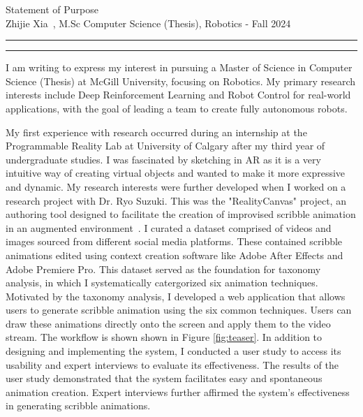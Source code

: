 \documentclass{article}
\newcommand{\soptitle}{Statement of Purpose}
\newcommand{\yourname}{Zhijie Xia}
\begin{document}
\begin{center}\LARGE\soptitle\\
\large \yourname\ , M.Sc Computer Science (Thesis), Robotics - Fall 2024
\end{center}

\hrule
\vspace{1pt}
\hrule height 1pt

\bigskip

I am writing to express my interest in pursuing a Master of Science in Computer Science (Thesis) at McGill University, 
focusing on Robotics. My primary research interests include Deep Reinforcement 
Learning and Robot Control for real-world applications, with the goal of leading a team to create fully autonomous robots.


My first experience with research occurred during an internship at the Programmable Reality Lab at University of Calgary 
after my third year of undergraduate studies. I was fascinated by sketching in AR as it is
a very intuitive way of creating virtual objects and wanted 
to make it more expressive and dynamic. 
My research interests were further developed when I worked on a research project with Dr. Ryo Suzuki. 
This was the "RealityCanvas" project, an authoring tool designed to facilitate the creation
of improvised scribble animation in an augmented environment~\cite{xia2023realitycanvas}.
I curated a dataset comprised of videos and images sourced from different social media platforms.
These contained scribble animations edited using context creation software like Adobe After Effects and Adobe Premiere Pro. 
This dataset served as the foundation for taxonomy analysis, in which I systematically catergorized
six animation techniques. Motivated by the taxonomy analysis,
I developed a web application that allows users to generate scribble animation using the six common techniques. 
Users can draw these animations directly onto the screen and apply them to the video stream. The workflow 
is shown shown in Figure \ref{fig:teaser}. In addition to designing and implementing the system, I conducted a user study to access its usability and expert
interviews to evaluate its effectiveness. The results of the user study demonstrated that the system facilitates
easy and spontaneous animation creation. Expert interviews further affirmed the system's effectiveness in generating 
scribble animations.
\end{document}

